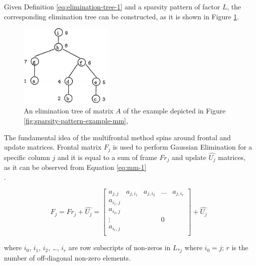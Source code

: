 Given Definition \ref{eq:elimination-tree-1} and a sparsity pattern of factor $L$, the corresponding elimination tree can be constructed, as it is shown in Figure \ref{fig:elimination-tree-mm}.\\



\begin{figure}[!htpb]
  \centering
  \includegraphics[width=0.4\textwidth]{figures/chapter-2/elimination-tree-mm.png}
\caption[An elimination tree of matrix $A$ of the example depicted in Figure \ref{fig:sparsity-pattern-example-mm}]{An elimination tree of matrix $A$ of the example depicted in Figure \ref{fig:sparsity-pattern-example-mm},
 \cite{mult-frontal-original:2}}
\label{fig:elimination-tree-mm}
\end{figure}


The fundamental idea of the multifrontal method spins around frontal and update matrices. Frontal matrix $F_{j}$ is used to perform Gaussian Elimination for a specific column $j$ and it is equal to a sum of  frame $Fr_{j}$ and update $\hat{U_{j}}$ matrices, as it can be observed from Equation \ref{eq:mm-1}\\.

\begin{equation} \label{eq:mm-1}
	F_{j} = Fr_{j} + \hat{U_{j}} = \begin{bmatrix}a_{j,j} & a_{j,i_1} & a_{j,i_2} & \dots & a_{j,i_r} \\
a_{i_1,j} \\
a_{i_2,j} \\
\vdots & & & 0\\
a_{i_r,j} \\
\end{bmatrix} + \hat{U_{j}}
\end{equation}

where $i_{0}$, $i_{1}$, $i_{2}$, \dots , $i_{r}$ are row subscripts of non-zeros in $L_{*j}$ where $i_{0} = j$; $r$ is the number of off-diagonal non-zero elements.\\

